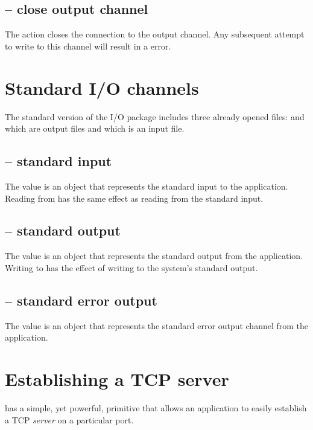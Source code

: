 \subsection{ -- close output channel}
\label{io:outclose}


The  action closes the connection to the output channel. Any subsequent attempt to write to this channel will result in a  error.

\section{Standard I/O channels}
\label{io:standard}
The standard version of the I/O package includes three already opened files:  and  which are output files and  which is an input file. 

\subsection{ -- standard input}
\label{io:stdin}

The  value is an  object that represents the standard input to the \go application. Reading from  has the same effect as reading from the standard input.

\subsection{ -- standard output}
\label{io:stdout}

The  value is an  object that represents the standard output from the \go application. Writing to  has the effect of writing to the system's standard output.

\subsection{ -- standard error output}
\label{io:stderr}

The  value is an  object that represents the standard error output channel from the \go application. 

\section{Establishing a TCP server}
\label{io:tcp}
\go has a simple, yet powerful, primitive that allows an application to easily establish a TCP \emph{server} on a particular port.

